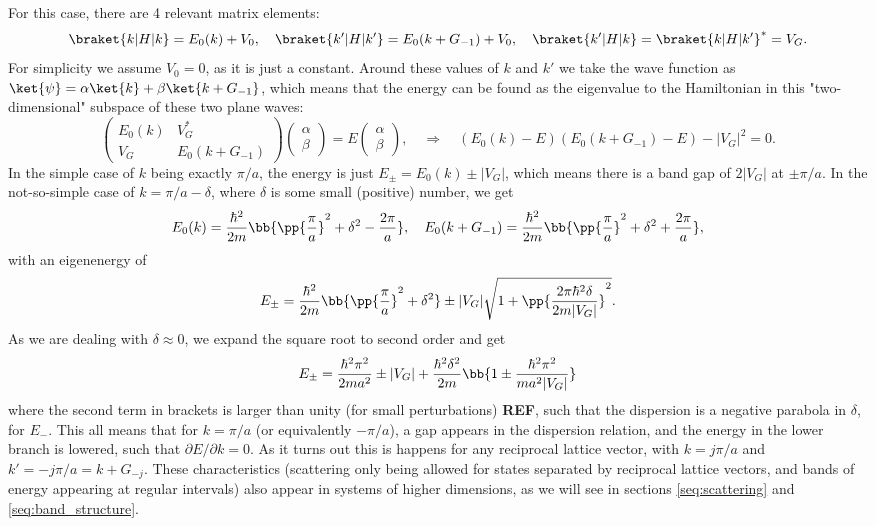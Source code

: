 \documentclass[main.tex]{subfiles}
\begin{document}
	For this case, there are 4 relevant matrix elements:
	\begin{align}
		\braket{k|H|k} = E_0(k) + V_0, \quad \braket{k'|H|k'} = E_0(k+G_{-1}) + V_0, \quad \braket{k'|H|k} = \braket{k|H|k'}^* = V_G.
	\end{align}
	For simplicity we assume $ V_0 = 0 $, as it is just a constant. Around these values of $ k $ and $ k' $ we take the wave function as $ \ket{\psi} = \alpha \ket{k} + \beta \ket{k+G_{-1}} $, which means that the energy can be found as the eigenvalue to the Hamiltonian in this "two-dimensional" subspace of these two plane waves:
	\begin{equation}\label{key}
		\begin{pmatrix}
			E_0(k) & V_G^* \\ V_G & E_0(k+G_{-1})
		\end{pmatrix} \begin{pmatrix}
		\alpha \\ \beta
		\end{pmatrix} = E \begin{pmatrix}
		\alpha \\ \beta
		\end{pmatrix}, \quad \Rightarrow \quad (E_0(k)-E)(E_0(k+G_{-1})-E) - |V_G|^2 = 0.
	\end{equation}
	In the simple case of $ k $ being exactly $ \pi/a $, the energy is just $ E_{\pm} = E_0(k) \pm | V_G| $, which means there is a band gap of $ 2|V_G| $ at $ \pm \pi/a $. In the not-so-simple case of $ k = \pi/a - \delta $, where $ \delta $ is some small (positive) number, we get
	\begin{equation}\label{key}
		E_0(k) = \frac{\hbar^2}{2m}\bb{\pp{\frac{\pi}{a}}^2 + \delta^2 - \frac{2\pi}{a}}, \quad E_0(k+G_{-1}) = \frac{\hbar^2}{2m} \bb{\pp{\frac{\pi}{a}}^2 + \delta^2 + \frac{2\pi}{a}},
	\end{equation}
	with an eigenenergy of
	\begin{equation}\label{key}
		E_{\pm} = \frac{\hbar^2}{2m} \bb{\pp{\frac{\pi}{a}}^2 + \delta^2 } \pm |V_G| \sqrt{1+ \pp{\frac{2\pi\hbar^2 \delta}{2m |V_G|}}^2 }.
	\end{equation}
	As we are dealing with $ \delta \approx 0 $, we expand the square root to second order and get
	\begin{equation}\label{key}
		E_{\pm} = \frac{\hbar^2 \pi^2}{2m a^2} \pm |V_G| + \frac{\hbar^2 \delta^2}{2m} \bb{1 \pm \frac{\hbar^2 \pi^2}{m a^2 |V_G|}}
	\end{equation}
	where the second term in brackets is larger than unity (for small perturbations) \textbf{REF}, such that the dispersion is a negative parabola in $ \delta $, for $ E_- $. This all means that for $ k =\pi/a$ (or equivalently $ -\pi/a $), a gap appears in the dispersion relation, and the energy in the lower branch is lowered, such that $ \partial E/ \partial k =0$. As it turns out this is happens for any reciprocal lattice vector, with $ k = j \pi/a $ and $ k'=-j \pi /a = k+G_{-j}$. These characteristics (scattering only being allowed for states separated by reciprocal lattice vectors, and bands of energy appearing at regular intervals) also appear in systems of higher dimensions, as we will see in sections \ref{seq:scattering} and \ref{seq:band_structure}.
	
\end{document}
